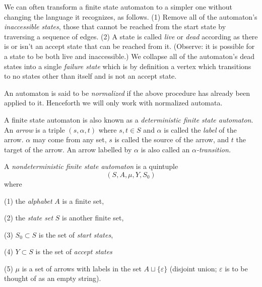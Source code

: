\begin{ap} We can often transform a finite state automaton to a
    simpler one without changing the language it recognizes, as
    follows. (1) Remove all of the automaton's \emph{inaccessible
    states}, those that cannot be reached from the start state by
    traversing a sequence of edges. (2) A state is called \emph{live}
    or \emph{dead} according as there is or isn't an accept state that
    can be reached from it. (Observe: it is possible for a state to be
    both live and inaccessible.) We collapse all of the automaton's
    dead states into a single \emph{failure state} which is by
    definition a vertex which transitions to no states other than
    itself and is not an accept state.

    An automaton is said to be \emph{normalized} if the above
    procedure has already been applied to it. Henceforth we will only
    work with normalized automata.
\end{ap}

\begin{ap} A finite state automaton is also known as a
    \emph{deterministic finite state automaton}. An \emph{arrow} is a
    triple $(s,\alpha,t)$ where $s,t \in S$ and $\alpha$ is called the
    \emph{label} of the arrow. $\alpha$ may come from any set, $s$ is
    called the source of the arrow, and $t$ the target of the arrow.
    An arrow labelled by $\alpha$ is also called an
    \emph{$\alpha$-transition.}
\end{ap}

\begin{defn} A \emph{nondeterministic finite state automaton} is a
    quintuple $$(S,A,\mu,Y,S_0)$$ where

    (1) the \emph{alphabet} $A$ is a
    finite set,

    (2) the \emph{state set} $S$ is another finite set,

    (3) $S_0 \subset S$ is the set of \emph{start states},

    (4) $Y \subset S$ is the set of \emph{accept states}

    (5) $\mu$ is a set of arrows with labels in the set $A\sqcup
    \{\varepsilon\}$ (disjoint union; $\varepsilon$ is to be thought
    of as an empty string).
\end{defn}


